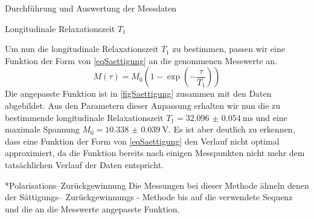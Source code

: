 \documentclass[pdftex, a4paper,11pt, twoside, ngerman]{report}
\begin{document}
\begin{chapter}{Durchführung und Auswertung der Messdaten}
\begin{section}{
        Longitudinale Relaxationszeit $T_{1}$}
\begin{subsection}
        Um nun die longitudinale Relaxationszeit $T_{1}$ zu bestimmen,
        passen wir eine Funktion der Form von \cref{eqSaettigung} an die
        genommenen Messwerte an.
        \begin{equation}
          \label{eqSaettigung}
          M(\tau)=M_{0}\left(1-\exp\left(-\frac{\tau}{T_{1}}\right)\right)
        \end{equation}
        Die angepasste Funktion ist in \cref{figSaettigung} zusammen mit den
        Daten abgebildet.
        Aus den Parametern dieser Anpassung erhalten wir nun die zu bestimmende
        longitudinale Relaxationszeit $T_{1}=\SI{32.096(54)}{\milli\second}$
        und eine maximale Spannung $M_{0}=\SI{10.338(39)}{\volt}$.
        Es ist aber deutlich zu erkennen, dass eine Funktion der Form von
        \cref{eqSaettigung} den Verlauf nicht optimal approximiert, da die
        Funktion bereits nach einigen Messpunkten nicht mehr dem tatsächlichen
        Verlauf der Daten entspricht.
        
      \end{subsection}
      
      
      
      \begin{subsection}*{Polarisations--Zurückgewinnung}
        \label{chpLongRelaxPolarisation}
        Die Messungen bei dieser Methode ähneln denen der Sättigungs--
        Zurückgewinnungs - Methode bis auf die verwendete Sequenz und die an die
        Messwerte angepasste Funktion.
        

\end{subsection}
\end{section}
\end{chapter}
\end{document}
